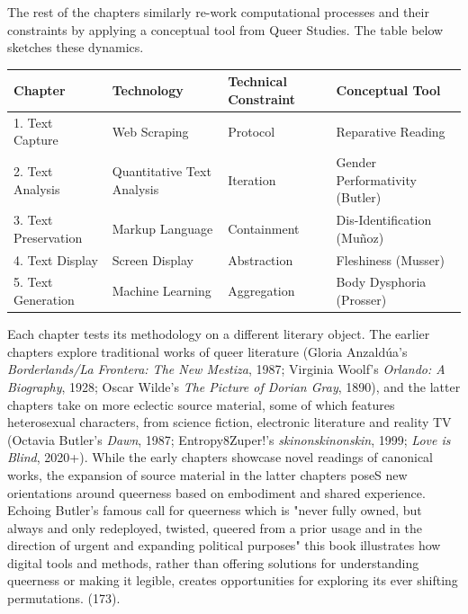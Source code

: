 \documentclass[11pt]{article}
\begin{document}
The rest of the chapters similarly re-work computational processes and
their constraints by applying a conceptual tool from Queer Studies.
The table below sketches these dynamics.

\begin{center}
\begin{tabular}{llll}
Chapter & Technology & Technical Constraint & Conceptual Tool\\[0pt]
\hline
1. Text Capture & Web Scraping & Protocol & Reparative Reading\\[0pt]
2. Text Analysis & Quantitative Text Analysis & Iteration & Gender Performativity (Butler)\\[0pt]
3. Text Preservation & Markup Language & Containment & Dis-Identification (Muñoz)\\[0pt]
4. Text Display & Screen Display & Abstraction & Fleshiness (Musser)\\[0pt]
5. Text Generation & Machine Learning & Aggregation & Body Dysphoria (Prosser)\\[0pt]
\end{tabular}
\end{center}


Each chapter tests its methodology on a different literary object. The
earlier chapters explore traditional works of queer literature (Gloria
Anzaldúa's \emph{Borderlands/La Frontera: The New Mestiza}, 1987; Virginia
Woolf’s \emph{Orlando: A Biography}, 1928; Oscar Wilde’s \emph{The Picture of
Dorian Gray}, 1890), and the latter chapters take on more eclectic
source material, some of which features heterosexual characters, from
science fiction, electronic literature and reality TV (Octavia
Butler's \emph{Dawn}, 1987; Entropy8Zuper!'s \emph{skinonskinonskin}, 1999;
\emph{Love is Blind}, 2020+). While the early chapters showcase novel
readings of canonical works, the expansion of source material in the
latter chapters poseS new orientations around queerness based on
embodiment and shared experience. Echoing Butler's famous call for
queerness which is "never fully owned, but always and only redeployed,
twisted, queered from a prior usage and in the direction of urgent and
expanding political purposes" this book illustrates how digital tools
and methods, rather than offering solutions for understanding
queerness or making it legible, creates opportunities for exploring
its ever shifting permutations. (173).
\end{document}
